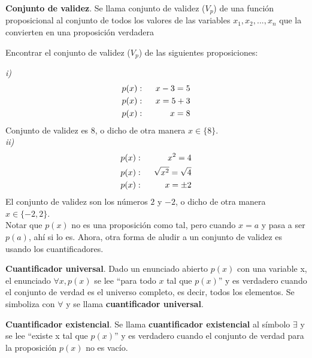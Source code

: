 \begin{mydef}\label{def:def444}
\textbf{Conjunto de validez}. Se llama conjunto de validez ($V_{p}$) de una función proposicional al conjunto de todos los valores de las variables $x_{1}, x_{2},...,x_{n}$ que la convierten en una proposición verdadera 
\end{mydef}

\begin{myexample}
Encontrar el conjunto de validez ($V_{p}$) de las siguientes proposiciones:
\end{myexample}
\noindent\textit{i)}
\begin{eqnarray}
p(x)&:& \hspace{6px} x-3=5\nonumber\\
p(x)&:& \hspace{6px} x=5+3\nonumber\\
p(x)&:& \hspace{6px} x=8
\end{eqnarray}
Conjunto de validez es 8, o dicho de otra manera $x\in \{8\}$.\\

\noindent\textit{ii)}
\begin{eqnarray}
p(x)&:& \hspace{6px} x^{2}=4\nonumber\\
p(x)&:& \hspace{6px} \sqrt{x^{2}}=\sqrt{4}\nonumber\\
p(x)&:& \hspace{6px} x=\pm 2
\end{eqnarray}
El conjunto de validez son los números $2$ y $-2$, o dicho de otra manera $x\in\{-2,2\}$.\\

Notar que $p(x)$ no es una proposición como tal, pero cuando $x=a$ y pasa a ser $p(a)$, ahí si lo es. Ahora, otra forma de aludir a un conjunto de validez es usando los cuantificadores. 

\begin{mydef}
\textbf{Cuantificador universal}. Dado un enunciado abierto $p(x)$ con una variable x, el enunciado $\forall x, p(x)$ se lee ``para todo $x$ tal que $p(x)$'' y es verdadero cuando el conjunto de verdad es el universo completo, es decir, todos los elementos. Se simboliza con $\forall$ y se llama \textbf{cuantificador universal}.
\end{mydef}

\begin{mydef}
\textbf{Cuantificador existencial}. Se llama \textbf{cuantificador existencial} al símbolo $\exists$ y se lee ``existe x tal que $p(x)$'' y es verdadero cuando el conjunto de verdad para la proposición $p(x)$ no es vacío.
\end{mydef}

